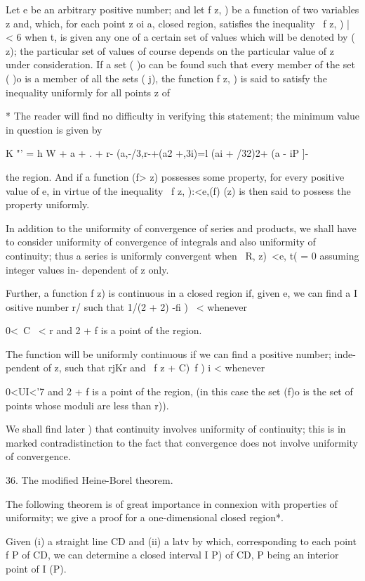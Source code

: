 Let e be an arbitrary positive number; and let f z, ) be a function of
two variables z and, which, for each point z oi a, closed region,
satisfies the inequality \ f z, ) | < 6 when t, is given any one of a
certain set of values which will be denoted by ( z); the particular
set of values of course depends on the particular value of z under
consideration. If a set ( )o can be found such that every member of
the set ( )o is a member of all the sets ( j), the function f z, ) is
said to satisfy the inequality uniformly for all points z of

* The reader will find no difficulty in verifying this statement; the
minimum value in question is given by

K "' = h W + a + . + r- (a,-/3,r-+(a2 +,3i)=l (ai + /32)2+ (a - iP ]-

%
%

the region. And if a function (f> z) possesses some property, for
every positive value of e, in virtue of the inequality \ f z, ):<e,(f)
(z) is then said to possess the property uniformly.

In addition to the uniformity of convergence of series and products,
we shall have to consider uniformity of convergence of integrals and
also uniformity of continuity; thus a series is uniformly convergent
when \ R, z)\ <e, t( = 0 assuming integer values in- dependent of z
only.

Further, a function f z) is continuous in a closed region if, given e,
we can find a I ositive number r/ such that 1/(2 + 2) -fi ) \ <
whenever

0<\ C \ < r and 2 + f is a point of the region.

The function will be uniformly continuous if we can find a positive
number; inde- pendent of z, such that rjKr and \ f z + C)~f ) i <
whenever

0<UI<'7 and 2 + f is a point of the region, (in this case the set (f)o
is the set of points whose moduli are less than r)).

We shall find later ) that continuity involves uniformity of
continuity; this is in marked contradistinction to the fact that
convergence does not involve uniformity of convergence.

36. The modified Heine-Borel theorem.

The following theorem is of great importance in connexion with
properties of uniformity; we give a proof for a one-dimensional
closed region*.

Given (i) a straight line CD and (ii) a latv by which, corresponding
to each point f P of CD, we can determine a closed interval I P) of
CD, P being an interior point of I (P).

